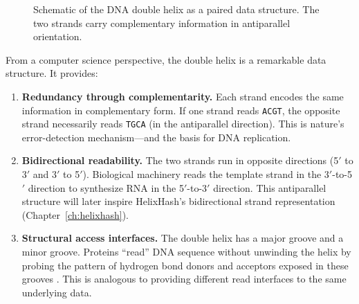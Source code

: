 \begin{figure}[H]
\centering
{}
\caption{Schematic of the DNA double helix as a paired data structure. The two strands carry complementary information in antiparallel orientation.}
\label{fig:dna-double-helix}
\end{figure}

From a computer science perspective, the double helix is a remarkable data structure. It provides:

\begin{enumerate}[leftmargin=1.8em]
  \item \textbf{Redundancy through complementarity.} Each strand encodes the same information in complementary form. If one strand reads \texttt{ACGT}, the opposite strand necessarily reads \texttt{TGCA} (in the antiparallel direction). This is nature's error-detection mechanism---and the basis for DNA replication.

  \item \textbf{Bidirectional readability.} The two strands run in opposite directions (5$'$ to 3$'$ and 3$'$ to 5$'$). Biological machinery reads the template strand in the 3$'$-to-5$'$ direction to synthesize RNA in the 5$'$-to-3$'$ direction. This antiparallel structure will later inspire HelixHash's bidirectional strand representation (Chapter~\ref{ch:helixhash}).

  \item \textbf{Structural access interfaces.} The double helix has a major groove and a minor groove. Proteins ``read'' DNA sequence without unwinding the helix by probing the pattern of hydrogen bond donors and acceptors exposed in these grooves \citep{alberts2022}. This is analogous to providing different read interfaces to the same underlying data.
\end{enumerate}

